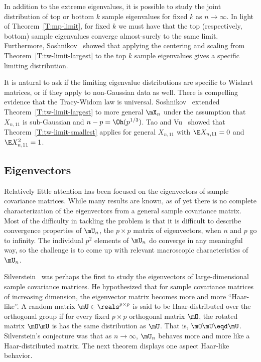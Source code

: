 In addition to the extreme eigenvalues, it is possible to study the joint distribution of top or bottom $k$ sample eigenvalues for fixed $k$ as
$n \to \infty$.  In light of Theorem~\ref{T:mp-limit}, for fixed $k$ we must have that the top (respectively, bottom) sample eigenvalues converge almost-surely to the same limit.  Furthermore, Soshnikov~\cite{soshnikov2002nud} showed that applying the centering and scaling from Theorem~\ref{T:tw-limit-largest} to the top $k$ sample eigenvalues gives a specific limiting distribution.

It is natural to ask if the limiting eigenvalue distributions are specific to Wishart matrices, or if they apply to non-Gaussian data as well.  There is compelling evidence that the Tracy-Widom law is universal.   Soshnikov~\cite{soshnikov2002nud} extended Theorem~\ref{T:tw-limit-largest} to more general $\mX_n$ under the assumption that $X_{n,11}$ is sub-Gaussian and $n-p = \Oh(p^{1/3})$.  Tao and Vu~\cite{tao2009rmd} showed that Theorem~\ref{T:tw-limit-smallest} applies for general $X_{n,11}$ with $\E X_{n,11} = 0$ and $\E X_{n,11}^2 = 1$.


\subsection{Eigenvectors}

Relatively little attention has been focused on the eigenvectors of sample covariance matrices.  While many results are known, as of yet there is no complete characterization of the eigenvectors from a general sample covariance matrix.  Most of the difficulty in tackling the problem is that it is difficult to describe convergence properties of $\mU_n$, the $p\times p$ matrix of eigenvectors, when $n$ and $p$ go to infinity.  The individual $p^2$ elements of $\mU_n$ do converge in any meaningful way, so the challenge is to come up with relevant macroscopic characteristics of $\mU_n$.

Silverstein~\cite{silverstein1979reg} was perhaps the first to study the eigenvectors of large-dimensional sample covariance matrices.  He hypothesized that for sample covariance matrices of increasing dimension, the eigenvector matrix becomes more and more ``Haar-like''.  A random matrix $\mU \in \reals^{p\times p}$ is said to be Haar-distributed over the orthogonal group if for every fixed $p \times p$ orthogonal matrix $\mO$, the rotated matrix $\mO \mU$ is has the same distribution as $\mU$.  That is, $\mO \mU \eqd \mU$.  Silverstein's conjecture was that as $n \to \infty$, $\mU_n$ behaves more and more like a Haar-distributed matrix.  The next theorem displays one aspect Haar-like behavior.

